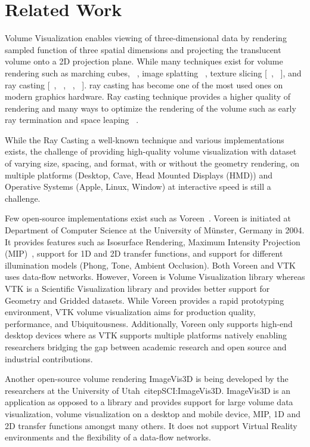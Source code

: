 \section{Related Work}
\label{relatedwork}

Volume Visualization enables viewing of three-dimensional data by rendering
sampled function of three spatial dimensions and projecting the translucent
volume onto a 2D projection plane. While many techniques exist for volume
rendering such as marching cubes, ~\citep{lorensen1987marching},
image splatting  ~\citep{westover1990footprint}, texture slicing
[~\citep{rezk2000interactive}, ~\citep{engel2001high}], and ray casting
[~\citep{hsu1993segmented}, ~\citep{ma1995parallel}, ~\citep{ma1997scalable},
~\citep{heng2006gpu}]. ray casting has become one of the most used ones on
modern graphics hardware. Ray casting technique provides a higher quality
of rendering and many ways to optimize the rendering of the volume such
as early ray termination and space leaping ~\citep{yagel1993accelerating}.

While the Ray Casting a well-known technique and various implementations
exists, the challenge of providing high-quality volume visualization with
dataset of varying size, spacing, and format, with or without the geometry
rendering, on multiple platforms (Desktop, Cave, Head Mounted Displays (HMD))
and Operative Systems (Apple, Linux, Window) at interactive speed is still a challenge.

Few open-source implementations exist such as Voreen~\citep{MRMH09}. Voreen is
initiated at Department of Computer Science at the University of Münster, Germany in 2004.
It provides features such as Isosurface Rendering,
Maximum Intensity Projection (MIP)~\citep{wallis1989three},
support for 1D and 2D transfer functions, and support for different illumination models
(Phong, Tone, Ambient Occlusion). Both Voreen and VTK uses data-flow networks. However,
Voreen is Volume Visualization library whereas VTK is a Scientific Visualization
library and provides better support for Geometry and Gridded datasets. While Voreen
provides a rapid prototyping environment, VTK volume visualization aims for production
quality, performance, and Ubiquitousness. Additionally, Voreen
only supports high-end desktop devices where as VTK supports multiple platforms
natively enabling researchers bridging the gap between academic research
and open source and industrial contributions.

Another open-source volume rendering ImageVis3D is being developed by the researchers
at the University of Utah~citep{SCI:ImageVis3D}. ImageVis3D is an application as opposed
to a library and provides support for large volume data visualization, volume visualization
on a desktop and mobile device, MIP, 1D and 2D transfer functions amongst many others.
It does not support Virtual Reality environments and the flexibility of a data-flow networks.

